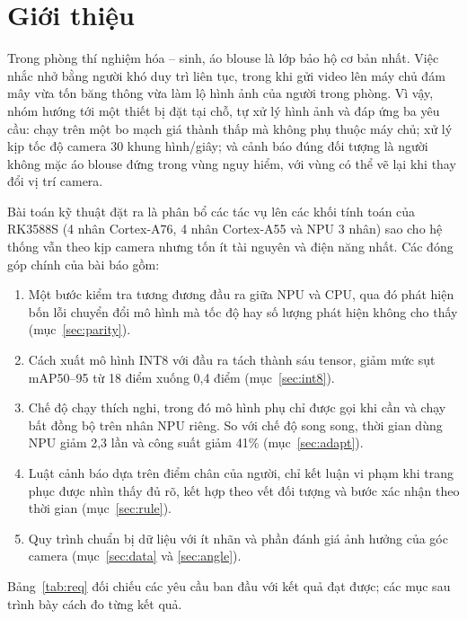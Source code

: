 \documentclass[11pt,a4paper,twocolumn]{article}
\begin{document}
\section{Giới thiệu}

Trong phòng thí nghiệm hóa -- sinh, áo blouse là lớp bảo hộ cơ bản nhất. Việc nhắc nhở bằng người khó duy trì liên tục, trong khi gửi video lên máy chủ đám mây
vừa tốn băng thông vừa làm lộ hình ảnh của người trong phòng. Vì vậy, nhóm hướng tới một thiết bị đặt tại chỗ, tự xử lý hình ảnh và đáp ứng ba yêu cầu: chạy trên một bo mạch
giá thành thấp mà không phụ thuộc máy chủ; xử lý kịp tốc độ camera 30 khung hình/giây; và cảnh báo đúng đối tượng là người không mặc áo blouse đứng trong vùng nguy hiểm,
với vùng có thể vẽ lại khi thay đổi vị trí camera.

Bài toán kỹ thuật đặt ra là phân bổ các tác vụ lên các khối tính toán của RK3588S (4 nhân Cortex-A76, 4 nhân Cortex-A55 và NPU 3 nhân) sao cho hệ thống vẫn theo kịp
camera nhưng tốn ít tài nguyên và điện năng nhất. Các đóng góp chính của bài báo gồm:

\begin{enumerate}
  \item Một bước kiểm tra tương đương đầu ra giữa NPU và CPU, qua đó phát hiện bốn lỗi chuyển đổi mô hình mà tốc độ hay số lượng phát hiện không cho thấy (mục~\ref{sec:parity}).
  \item Cách xuất mô hình INT8 với đầu ra tách thành sáu tensor, giảm mức sụt mAP50--95 từ 18 điểm xuống 0,4 điểm (mục~\ref{sec:int8}).
  \item Chế độ chạy thích nghi, trong đó mô hình phụ chỉ được gọi khi cần và chạy bất đồng bộ trên nhân NPU riêng. So với chế độ song song, thời gian dùng NPU giảm 2,3 lần và công suất giảm 41\% (mục~\ref{sec:adapt}).
  \item Luật cảnh báo dựa trên điểm chân của người, chỉ kết luận vi phạm khi trang phục được nhìn thấy đủ rõ, kết hợp theo vết đối tượng và bước xác nhận theo thời gian (mục~\ref{sec:rule}).
  \item Quy trình chuẩn bị dữ liệu với ít nhãn và phần đánh giá ảnh hưởng của góc camera (mục~\ref{sec:data} và \ref{sec:angle}).
\end{enumerate}

Bảng~\ref{tab:req} đối chiếu các yêu cầu ban đầu với kết quả đạt được; các mục sau trình bày cách đo từng kết quả.
\end{document}
